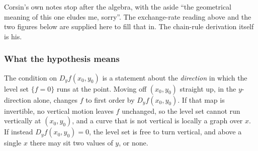 \begin{ainote}
Corsin's own notes stop after the algebra, with the aside ``the geometrical meaning of this one
eludes me, sorry''. The exchange-rate reading above and the two figures below are supplied here
to fill that in. The chain-rule derivation itself is his.
\end{ainote}

\subsubsection*{What the hypothesis means}

The condition on $D_yf(x_0,y_0)$ is a statement about the \emph{direction} in which the level
set $\{f=0\}$ runs at the point. Moving off $(x_0,y_0)$ straight up, in the $y$-direction alone,
changes $f$ to first order by $D_yf(x_0,y_0)$. If that map is invertible, no vertical motion
leaves $f$ unchanged, so the level set cannot run vertically at $(x_0,y_0)$, and a curve that is
not vertical is locally a graph over $x$. If instead $D_yf(x_0,y_0)=0$, the level set is free
to turn vertical, and above a single $x$ there may sit two values of $y$, or none.

